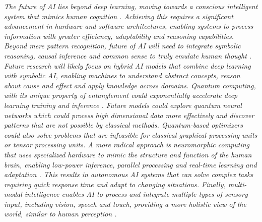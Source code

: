 \documentclass[preprint,12pt]{elsarticle}
\begin{document}
\emph{The future of AI lies beyond deep learning, moving towards a conscious intelligent system that mimics human cognition \citep{butlin_consciousness_2023}. Achieving this requires a significant advancement in hardware and software architectures, enabling systems to process information with greater efficiency, adaptability and reasoning capabilities. Beyond mere pattern recognition, future of AI will need to integrate symbolic reasoning, causal inference and common sense to truly emulate human thought \citep{marra_statistical_2024, colelough_neuro-symbolic_2025, bhuyan_neuro-symbolic_2024}. Future research will likely focus on hybrid AI models that combine deep learning with symbolic AI, enabling machines to understand abstract concepts, reason about cause and effect and apply knowledge across domains. Quantum computing, with its unique property of entanglement could exponentially accelerate deep learning training and inference \citep{wu_survey_2025, klusch_quantum_2024}. Future models could explore quantum neural networks which could process high dimensional data more effectively and discover patterns that are not possible by classical methods. Quantum-based optimizers could also solve problems that are infeasible for classical graphical processing units or tensor processing units. A more radical approach is neuromorphic computing that uses specialized hardware to mimic the structure and function of the human brain, enabling low-power inference, parallel processing and real-time learning and adaptation \citep{shrestha_survey_2022, kudithipudi_neuromorphic_2025}. This results in autonomous AI systems that can solve complex tasks requiring quick response time and adapt to changing situations. Finally, multi-modal intelligence enables AI to process and integrate multiple types of sensory input, including vision, speech and touch, providing a more holistic view of the world, similar to human perception \citep{fei_towards_2022}. }
\end{document}
